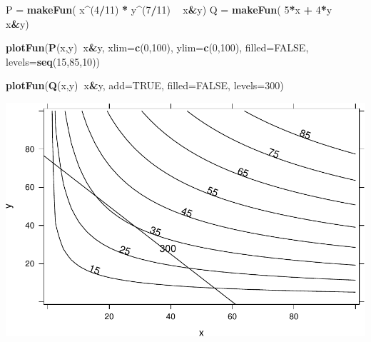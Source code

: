 \documentclass[
]{book}
\newenvironment{Shaded}{\begin{snugshade}}{\end{snugshade}}
\newcommand{\DataTypeTok}[1]{\textcolor[rgb]{0.13,0.29,0.53}{#1}}
\newcommand{\DecValTok}[1]{\textcolor[rgb]{0.00,0.00,0.81}{#1}}
\newcommand{\KeywordTok}[1]{\textcolor[rgb]{0.13,0.29,0.53}{\textbf{#1}}}
\newcommand{\NormalTok}[1]{#1}
\newcommand{\OperatorTok}[1]{\textcolor[rgb]{0.81,0.36,0.00}{\textbf{#1}}}
\newcommand{\OtherTok}[1]{\textcolor[rgb]{0.56,0.35,0.01}{#1}}
\newcommand{\StringTok}[1]{\textcolor[rgb]{0.31,0.60,0.02}{#1}}
\begin{document}
\begin{Shaded}
\begin{Highlighting}[]
\NormalTok{P =}\StringTok{ }\KeywordTok{makeFun}\NormalTok{( x}\OperatorTok{^}\NormalTok{(}\DecValTok{4}\OperatorTok{/}\DecValTok{11}\NormalTok{) }\OperatorTok{*}\StringTok{ }\NormalTok{y}\OperatorTok{^}\NormalTok{(}\DecValTok{7}\OperatorTok{/}\DecValTok{11}\NormalTok{) }\OperatorTok{~}\StringTok{ }\NormalTok{x}\OperatorTok{&}\NormalTok{y)}
\NormalTok{Q =}\StringTok{ }\KeywordTok{makeFun}\NormalTok{( }\DecValTok{5}\OperatorTok{*}\NormalTok{x }\OperatorTok{+}\StringTok{ }\DecValTok{4}\OperatorTok{*}\NormalTok{y }\OperatorTok{~}\StringTok{ }\NormalTok{x}\OperatorTok{&}\NormalTok{y)}

\KeywordTok{plotFun}\NormalTok{(}\KeywordTok{P}\NormalTok{(x,y)}\OperatorTok{~}\NormalTok{x}\OperatorTok{&}\NormalTok{y, }\DataTypeTok{xlim=}\KeywordTok{c}\NormalTok{(}\DecValTok{0}\NormalTok{,}\DecValTok{100}\NormalTok{), }\DataTypeTok{ylim=}\KeywordTok{c}\NormalTok{(}\DecValTok{0}\NormalTok{,}\DecValTok{100}\NormalTok{), }\DataTypeTok{filled=}\OtherTok{FALSE}\NormalTok{, }\DataTypeTok{levels=}\KeywordTok{seq}\NormalTok{(}\DecValTok{15}\NormalTok{,}\DecValTok{85}\NormalTok{,}\DecValTok{10}\NormalTok{))}
\end{Highlighting}
\end{Shaded}

\begin{Shaded}
\begin{Highlighting}[]
\KeywordTok{plotFun}\NormalTok{(}\KeywordTok{Q}\NormalTok{(x,y)}\OperatorTok{~}\NormalTok{x}\OperatorTok{&}\NormalTok{y, }\DataTypeTok{add=}\OtherTok{TRUE}\NormalTok{, }\DataTypeTok{filled=}\OtherTok{FALSE}\NormalTok{, }\DataTypeTok{levels=}\DecValTok{300}\NormalTok{)}
\end{Highlighting}
\end{Shaded}

\includegraphics{_bookdown_files/math135_handbook_files/figure-latex/unnamed-chunk-118-1.pdf}
\end{document}
